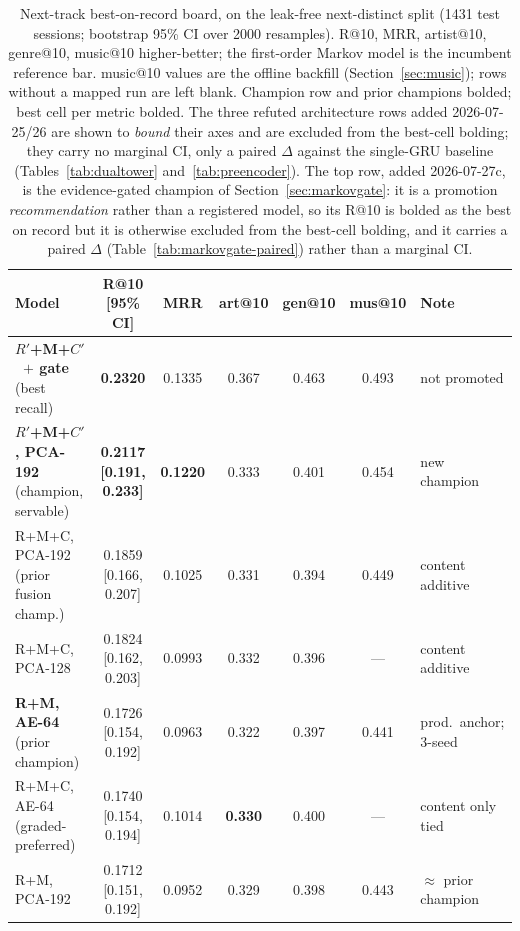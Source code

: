 \documentclass[11pt]{article}
\newcommand{\best}[1]{\textbf{#1}}
\newcommand{\Rp}{\ensuremath{R'}}
\newcommand{\Cp}{\ensuremath{C'}}
\begin{document}
\begin{table}[ht]
  \centering
  \caption{Next-track best-on-record board, on the leak-free next-distinct split
  (\num{1431} test sessions; bootstrap 95\% CI over \num{2000} resamples). R@10,
  MRR, artist@10, genre@10, music@10 higher-better; the first-order Markov model is
  the incumbent reference bar. music@10 values are the offline backfill
  (Section~\ref{sec:music}); rows without a mapped run are left blank. Champion
  row and prior champions bolded; best cell per metric bolded. The three refuted
  architecture rows added 2026-07-25/26 are shown to \emph{bound} their axes and
  are excluded from the best-cell bolding; they carry no marginal CI, only a
  paired $\Delta$ against the single-GRU baseline (Tables~\ref{tab:dualtower}
  and~\ref{tab:preencoder}). The top row, added 2026-07-27c, is the evidence-gated
  champion of Section~\ref{sec:markovgate}: it is a promotion \emph{recommendation}
  rather than a registered model, so its R@10 is bolded as the best on record but it
  is otherwise excluded from the best-cell bolding, and it carries a paired $\Delta$
  (Table~\ref{tab:markovgate-paired}) rather than a marginal CI.}
  \label{tab:lb}
  {\footnotesize\setlength{\tabcolsep}{3.2pt}\begin{tabular}{lcccccl}
    \toprule
    Model & R@10 [95\% CI] & MRR & art@10 & gen@10 & mus@10 & Note \\
    \midrule
    \best{\Rp+M+\Cp\ $+$ gate} (best recall) & \best{0.2320} & 0.1335 & 0.367 & 0.463 & 0.493 & not promoted \\
    \best{\Rp+M+\Cp, PCA-192} (champion, servable) & \best{0.2117 [0.191, 0.233]} & \best{0.1220} & 0.333 & 0.401 & 0.454 & new champion \\
    R+M+C, PCA-192 (prior fusion champ.)  & 0.1859 [0.166, 0.207] & 0.1025 & 0.331 & 0.394 & 0.449 & content additive \\
    R+M+C, PCA-128                        & 0.1824 [0.162, 0.203] & 0.0993 & 0.332 & 0.396 & --- & content additive \\
    \best{R+M, AE-64} (prior champion)    & 0.1726 [0.154, 0.192] & 0.0963 & 0.322 & 0.397 & 0.441 & prod.\ anchor; 3-seed \\
    R+M+C, AE-64 (graded-preferred)       & 0.1740 [0.154, 0.194] & 0.1014 & \best{0.330} & 0.400 & --- & content only tied \\
    R+M, PCA-192                          & 0.1712 [0.151, 0.192] & 0.0952 & 0.329 & 0.398 & 0.443 & $\approx$ prior champion \\

\end{tabular}}
\end{table}
\end{document}

